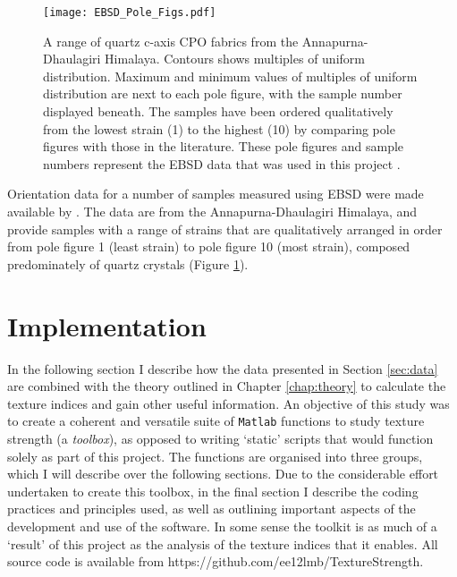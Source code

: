 \documentclass[a4paper,12pt,twoside]{report}
\numberwithin{equation}{chapter}
\begin{document}
\begin{figure}[t!]
  \centering
    \texttt{[image: EBSD\_Pole\_Figs.pdf]}
  \caption[EBSD data (pole figures)]{A range of quartz c-axis CPO fabrics from the Annapurna-Dhaulagiri Himalaya. Contours shows multiples of uniform distribution. Maximum and minimum values of multiples of uniform distribution are next to each pole figure, with the sample number displayed beneath. The samples have been ordered qualitatively from the lowest strain (1) to the highest (10) by comparing pole figures with those in the literature. These pole figures and sample numbers represent the EBSD data that was used in this project \citep[made available from][]{ParsonsThesis}.}
  \label{fig:EBSD_data}
\end{figure}  

Orientation data for a number of samples measured using EBSD were made available by \cite{ParsonsThesis}. The data are from the Annapurna-Dhaulagiri Himalaya, and provide samples with a range of strains that are qualitatively arranged in order from pole figure 1 (least strain) to pole figure 10 (most strain), composed predominately of quartz crystals (Figure \ref{fig:EBSD_data}). 



\section{Implementation}

In the following section I describe how the data presented in Section \ref{sec:data} are combined with the theory outlined in Chapter \ref{chap:theory} to calculate the texture indices and gain other useful information. An objective of this study was to create a coherent and versatile suite of \texttt{Matlab} functions to study texture strength (a \emph{toolbox}), as opposed to writing \lq{}static\rq{} scripts that would function solely as part of this project. The functions are organised into three groups, which I will describe over the following sections. Due to the considerable effort undertaken to create this toolbox, in the final section I describe the coding practices and principles used, as well as outlining important aspects of the development and use of the software. In some sense the toolkit is as much of a \lq{}result\rq{} of this project as the analysis of the texture indices that it enables. All source code is available from https://github.com/ee12lmb/TextureStrength.                                                                                                     
\end{document}
